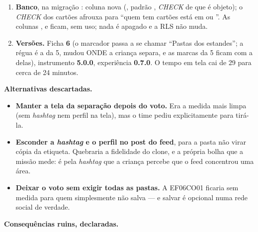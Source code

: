 \begin{enumerate}
    pede   (novo
    nos passos pedidos) e segue para a espera SEM marca da EF06CO01; quem
    parou em  conclui por , sem marcar.
  \item \textbf{Banco}, na migração
    : coluna
    nova  (, padrão
    , \emph{CHECK} de que é objeto); o \emph{CHECK} dos cartões
    afrouxa para \enquote{quem tem cartões está em  ou
    }. As colunas ,  e 
    ficam, sem uso; nada é apagado e a RLS não muda.
  \item \textbf{Versões.} Ficha \textbf{6} (o marcador 
    passa a se chamar \enquote{Pastas dos estandes}; a régua é a da 5, mudou
    ONDE a criança separa, e as marcas da 5 ficam com a delas), instrumento
    \textbf{5.0.0}, experiência \textbf{0.7.0}. O tempo em tela cai de 29
    para cerca de 24 minutos.
\end{enumerate}

\textbf{Alternativas descartadas.}

\begin{itemize}
  \item \textbf{Manter a tela da separação depois do voto.} Era a medida mais
    limpa (sem \emph{hashtag} nem perfil na tela), mas o time pediu
    explicitamente para tirá-la.
  \item \textbf{Esconder a \emph{hashtag} e o perfil no post do feed}, para a
    pasta não virar cópia da etiqueta. Quebraria a fidelidade do clone, e a
    própria bolha que a missão mede: é pela \emph{hashtag} que a criança
    percebe que o feed concentrou uma área.
  \item \textbf{Deixar o voto sem exigir todas as pastas.} A EF06CO01 ficaria
    sem medida para quem simplesmente não salva --- e salvar é opcional numa
    rede social de verdade.
\end{itemize}

\textbf{Consequências ruins, declaradas.}

